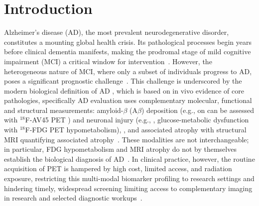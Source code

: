 \documentclass{article}
\providecommand{\DIFaddtex}[1]{{\protect\color{blue} \sf #1}} %
\providecommand{\DIFdeltex}[1]{{\protect\color{red} \scriptsize #1}} %
\providecommand{\DIFaddbegin}{} %
\providecommand{\DIFaddend}{} %
\providecommand{\DIFdelbegin}{} %
\providecommand{\DIFdelend}{} %
\providecommand{\DIFadd}[1]{\texorpdfstring{\DIFaddtex{#1}}{#1}} %
\providecommand{\DIFdel}[1]{\texorpdfstring{\DIFdeltex{#1}}{}} %
\newcommand{\DIFscaledelfig}{0.5}
\newlength{\DIFdelgraphicswidth} %
\newlength{\DIFdelgraphicsheight} %
\newcommand{\DIFaddincludegraphics}[2][]{{\color{blue}\fbox{\DIFOincludegraphics[#1]{#2}}}} %
\newcommand{\DIFdelincludegraphics}[2][]{%
\sbox{\DIFdelgraphicsbox}{\DIFOincludegraphics[#1]{#2}}%
\settoboxwidth{\DIFdelgraphicswidth}{\DIFdelgraphicsbox} %
\settoboxtotalheight{\DIFdelgraphicsheight}{\DIFdelgraphicsbox} %
\scalebox{\DIFscaledelfig}{%
\parbox[b]{\DIFdelgraphicswidth}{\usebox{\DIFdelgraphicsbox}\\[-\baselineskip] \rule{\DIFdelgraphicswidth}{0em}}\llap{\resizebox{\DIFdelgraphicswidth}{\DIFdelgraphicsheight}{%
\setlength{\unitlength}{\DIFdelgraphicswidth}%
\begin{picture}(1,1)%
\thicklines\linethickness{2pt} %
{\color[rgb]{1,0,0}\put(0,0){\framebox(1,1){}}}%
{\color[rgb]{1,0,0}\put(0,0){\line( 1,1){1}}}%
{\color[rgb]{1,0,0}\put(0,1){\line(1,-1){1}}}%
\end{picture}%
}\hspace*{3pt}}} %
} %
\DeclareRobustCommand{\DIFaddbegin}{\DIFOaddbegin \let\includegraphics\DIFaddincludegraphics} %
\DeclareRobustCommand{\DIFaddend}{\DIFOaddend \let\includegraphics\DIFOincludegraphics} %
\DeclareRobustCommand{\DIFdelbegin}{\DIFOdelbegin \let\includegraphics\DIFdelincludegraphics} %
\DeclareRobustCommand{\DIFdelend}{\DIFOaddend \let\includegraphics\DIFOincludegraphics} %
\begin{document}
\section{Introduction}
Alzheimer's disease (AD), the most prevalent neurodegenerative disorder, constitutes a mounting global health crisis. Its pathological processes begin years before clinical dementia manifests, making the prodromal stage of mild cognitive impairment (MCI) a critical window for intervention~\cite{scheltens2021alzheimer}. However, the heterogeneous nature of MCI, where only a subset of individuals progress to AD, poses a significant prognostic challenge~\cite{haller2023neuroimaging}. \DIFdelbegin \DIFdel{This challenge is underscored by the modern biological definition of AD , which is based on in vivo evidence of core pathologies, specifically }\DIFdelend \DIFaddbegin \DIFadd{AD evaluation uses complementary molecular, functional and structural measurements: }\DIFaddend amyloid-$\beta$ (A$\beta$) deposition \DIFdelbegin \DIFdel{(e.g., on }\DIFdelend \DIFaddbegin \DIFadd{can be assessed with }\DIFaddend $^{18}$F-AV45 PET\DIFdelbegin \DIFdel{) and neuronal injury (e.g., }\DIFdelend \DIFaddbegin \DIFadd{, glucose-metabolic dysfunction with }\DIFaddend $^{18}$F-FDG PET\DIFdelbegin \DIFdel{hypometabolism), }\DIFdelend \DIFaddbegin \DIFadd{, and associated atrophy }\DIFaddend with structural MRI\DIFdelbegin \DIFdel{quantifying associated atrophy}\DIFdelend ~\cite{ossenkoppele2022amyloid,yan2021sex,haller2023neuroimaging}. \DIFaddbegin \DIFadd{These modalities are not interchangeable; in particular, FDG hypometabolism and MRI atrophy do not by themselves establish the biological diagnosis of AD~\cite{jack2024revised}. }\DIFaddend In clinical practice, however, the routine acquisition of PET is hampered by high cost, limited access, and radiation exposure, \DIFdelbegin \DIFdel{restricting this multi-modal biomarker profiling to research settings and hindering timely, widespread screening}\DIFdelend \DIFaddbegin \DIFadd{limiting access to complementary imaging in research and selected diagnostic workups}\DIFaddend ~\cite{nordberg2010use}.
\end{document}
